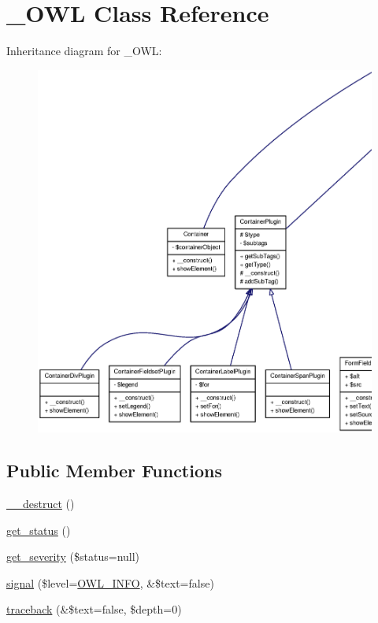 \section{\_\-OWL Class Reference}
\label{class__OWL}


Inheritance diagram for \_\-OWL:\nopagebreak
\begin{figure}[H]
\begin{center}
\leavevmode
\includegraphics[width=400pt]{class__OWL__inherit__graph}
\end{center}
\end{figure}
\subsection*{Public Member Functions}
\begin{DoxyCompactItemize}
\item 
\hyperlink{class__OWL_a44fd2222476a3109286cc82d92b6bbcc}{\_\-\_\-destruct} ()
\item 
\hyperlink{class__OWL_a99ec771fa2c5c279f80152cc09e489a8}{get\_\-status} ()
\item 
\hyperlink{class__OWL_adf9509ef96858be7bdd9414c5ef129aa}{get\_\-severity} (\$status=null)
\item 
\hyperlink{class__OWL_a51ba4a16409acf2a2f61f286939091a5}{signal} (\$level=\hyperlink{owl_8severitycodes_8php_a139328861128689f2f4def6a399d9057}{OWL\_\-INFO}, \&\$text=false)
\item 
\hyperlink{class__OWL_aa29547995d6741b7d2b90c1d4ea99a13}{traceback} (\&\$text=false, \$depth=0)
\end{DoxyCompactItemize}

